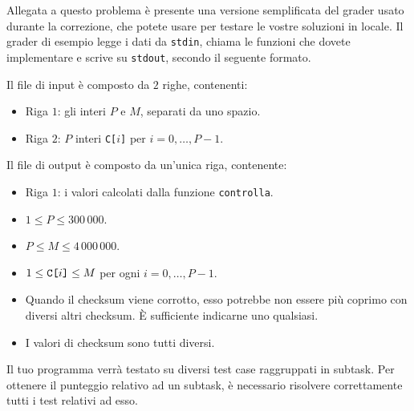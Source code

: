 \Grader
Allegata a questo problema è presente una versione semplificata del grader usato durante la correzione, che potete usare per testare le vostre soluzioni in locale. Il grader di esempio legge i dati da \texttt{stdin}, chiama le funzioni che dovete implementare e scrive su \texttt{stdout}, secondo il seguente formato.

Il file di input è composto da $2$ righe, contenenti:
\begin{itemize}[nolistsep,itemsep=2mm]
\item Riga $1$: gli interi $P$ e $M$, separati da uno spazio.
\item Riga $2$: $P$ interi \texttt{C[$i$]} per $i = 0,\ldots, P-1$.
\end{itemize}

Il file di output è composto da un'unica riga, contenente:
\begin{itemize}[nolistsep,itemsep=2mm]
\item Riga $1$: i valori calcolati dalla funzione \texttt{controlla}.
\end{itemize}



\Constraints

\begin{itemize}[nolistsep, itemsep=2mm]
	\item $1 \le P \le 300\,000$.
        \item $P \le M \le 4\,000\,000$.
	\item $1 \le \text{\texttt{C[$i$]}} \le M$ per ogni $i=0,\ldots, P-1$.
        \item Quando il checksum viene corrotto, esso potrebbe non essere più coprimo con diversi altri checksum. È sufficiente indicarne uno qualsiasi.
        \item I valori di checksum sono tutti diversi.
\end{itemize}



\Scoring

Il tuo programma verrà testato su diversi test case raggruppati in subtask.
Per ottenere il punteggio relativo ad un subtask, è necessario risolvere correttamente tutti i test relativi ad esso.

